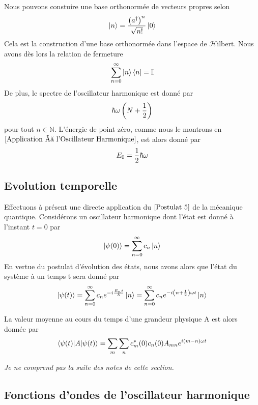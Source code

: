 \documentclass[../Notesdecours.tex]{subfiles}
\begin{document}
Nous pouvons constuire une base orthonormée de vecteurs propres selon 
\begin{equation}
    \ket{n} = \frac{\left(a^\dagger\right)^n}{\sqrt{n!}}\ket{0}
\end{equation}
Cela est la construction d'une base orthonormée dans l'espace de $\mathcal{H}$ilbert. Nous avons dès lors la relation de fermeture
\begin{equation}
    \sum_{n = 0}^{\infty} \ket{n}\bra{n} = \mathbb{I}
\end{equation}
De plus, le spectre de l'oscillateur harmonique est donné par 
\begin{equation}
    \hbar\omega\left(N+\frac{1}{2}\right)
\end{equation}
pour tout $n\in\mathbb{N}$. L'énergie de point zéro, comme nous le montrons en $\ref{Application à l'Oscillateur Harmonique}$, est alors donné par
\begin{equation}
    E_0 = \frac{1}{2}\hbar\omega
\end{equation}

\subsection{Evolution temporelle}
Effectuons à présent une directe application du $\ref{Postulat 5}$ de la mécanique quantique. Considérons un oscillateur harmonique dont l'état est donné à l'instant $t = 0$ par
\begin{equation}
    \ket{\psi (0)} = \sum_{n = 0}^{\infty} c_n\ket{n}
\end{equation}
En vertue du postulat d'évolution des états, nous avons alors que l'état du système à un temps t sera donné par
\begin{equation}
    \ket{\psi (t)} = \sum_{n = 0}^{\infty} c_n e^{-i \frac{E_n t}{\hbar}}\ket{n} = \sum_{n = 0}^{\infty} c_n e^{-i\left(n+\frac{1}{2}\right)\omega t}\ket{n}
\end{equation}

La valeur moyenne au cours du temps d'une grandeur physique A est alors donnée par
\begin{equation}
    \braket{\psi(t)|A|\psi(t)} = \sum_m \sum_n c_m^* (0)c_n (0)A_{mn}e^{i\left(m-n\right)\omega t}
\end{equation}

\color{red} \textit{Je ne comprend pas la suite des notes de cette section.}

\color{black}

\subsection{Fonctions d'ondes de l'oscillateur harmonique}
\end{document}
